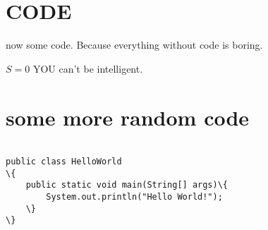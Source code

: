 \documentclass[11pt, a4paper, twocolumn]{IEEEtran}
\begin{document}
\section{CODE}
now some code. Because everything without code is boring.
\begin{algorithmic}
    \STATE $S=0$
  \ELSE {} \ENDIF
{}  \ENDWHILE
\PRINT YOU can't be intelligent.
\end{algorithmic}
\section{some more random code}
\begin{lstlisting}

public class HelloWorld
\{
	public static void main(String[] args)\{ 
		System.out.println("Hello World!");
	\}
\}
\end{lstlisting}


\end{document}
